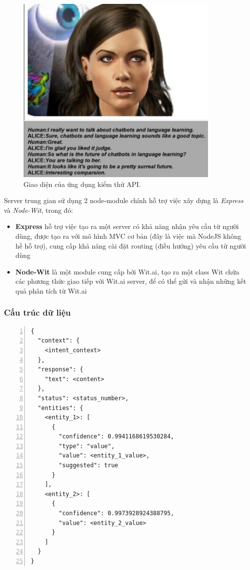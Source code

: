 \documentclass[12pt]{report}
\begin{document}
\begin{figure}[H]
	\centering
    \includegraphics[width=10cm]{Pics/Chap1/alice.jpg}
  	\caption{Giao diện của ứng dụng kiểm thử API.}
\end{figure}

Server trung gian sử dụng 2 node-module chính hỗ trợ việc xây dựng là \textit{Express} và \textit{Node-Wit}, trong đó:

\begin{itemize}
	\item \textbf{Express} hỗ trợ việc tạo ra một server có khả năng nhận yêu cầu từ người dùng, được tạo ra với mô hình MVC cơ bản (đây là việc mà NodeJS không hề hỗ trợ), cung cấp khả năng cài đặt routing (điều hướng) yêu cầu từ người dùng
	\item \textbf{Node-Wit} là một module cung cấp bởi Wit.ai, tạo ra một class Wit chứa các phương thức giao tiếp với Wit.ai server, để có thể gửi và nhận những kết quả phân tích từ Wit.ai
\end{itemize}

\subsubsection{Cấu trúc dữ liệu}

\begin{lstlisting}[frame=lines, basicstyle=\footnotesize\ttfamily, numbers=left, numberstyle=\tiny\color{black},caption= {Cấu trúc một API trả về}, backgroundcolor=\color{background}]
{
  "context": {
    <intent_context>
  },
  "response": {
    "text": <content>
  },
  "status": <status_number>,
  "entities": {
    <entity_1>: [
      {
        "confidence": 0.9941168619530284,
        "type": "value",
        "value": <entity_1_value>,
        "suggested": true
      }
    ],
    <entity_2>: [
      {
        "confidence": 0.9973928924388795,
        "value": <entity_2_value>
      }
    ]
  }
}
\end{lstlisting}
\end{document}
